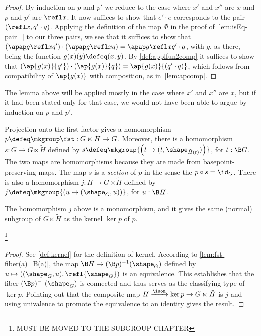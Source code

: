 \begin{proof}
  By induction on $p$ and $p'$ we reduce to the case where $x'$ and $x''$ are $x$ and $p$ and $p'$ are $\refl x$.
  It now suffices to show that $e' \cdot e$ corresponds to the pair $(\refl x , q' \cdot q)$.
  Applying the definition of the map $\Phi$ in the proof of \cref{lem:isEq-pair=} to our three pairs, we see that it suffices to show that
  $\left( \apap g {\refl x} {q'} \right) \cdot \left( \apap g {\refl x} {q} \right) = \apap g {\refl x} {q' \cdot q}$, with $g$, as there, being the function $ g(x)(y) \defeq (x,y)$.
  By \cref{def:applfun2comp} it suffices to show that $\left( \ap {g(x)} {q'} \right) \cdot \left( \ap {g(x)} {q} \right) = \ap {g(x)} {(q' \cdot q)}$, which follows from
  compatibility of $\ap {g(x)}$ with composition, as in~\cref{lem:apcomp}.
\end{proof}

The lemma above will be applied mostly in the case where $x'$ and $x''$ are $x$, but if it had been stated only for that case, we would not have
been able to argue by induction on $p$ and $p'$.

Projection onto the first factor gives a homomorphism $p \defeq \mkgroup \fst : G \ltimes \tilde H \to G$.
Moreover, there is a homomorphism $s : G \to G \ltimes \tilde H$ defined by
$ s \defeq \mkgroup {\left( t \mapsto (t,\shape_{\tilde H(t)}) \right) }$, for $t : \B G$.
The two maps are homomorphisms because they are made from basepoint-preserving maps.
The map $s$ is a \emph{section} of $p$ in the sense the $p \circ s = \id_G$.
There is also a homomorphism $j : H \to G \ltimes \tilde H$ defined by $j \defeq \mkgroup { \left( u \mapsto (\shape_G,u) \right) }$, for $u : \B H$.

\begin{lemma}
  The homomorphism $j$ above is a monomorphism, and it gives the same (normal) subgroup of $G \ltimes \tilde H$ as the kernel $\ker p$ of $p$.
\end{lemma}
\footnote{{\color{red}MUST BE MOVED TO THE SUBGROUP CHAPTER}}

\begin{proof}
  See \ref{def:kernel} for the definition of kernel.  According to \cref{lem:fst-fiber(a)=B(a)}, the map $\B H \to (\B p)^{-1}(\shape_G)$ defined by
  $ u \mapsto ((\shape_G,u), \refl{\shape_G}) $ is an equivalence.  This establishes that the fiber $(\B p)^{-1}(\shape_G)$ is connected and thus serves as
  the classifying type of $\ker p$.  Pointing out that the composite map $H \xrightarrow{\isom} \ker p \to G \ltimes \tilde H$ is $j$ and using
  univalence to promote the equivalence to an identity gives the result.
\end{proof}

